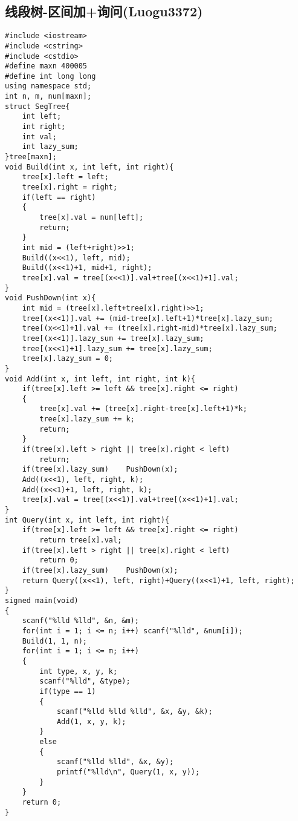 \documentclass[UTF8]{ctexart}
\begin{document}
	\subsection{线段树-区间加+询问(Luogu3372)}
	{\setmainfont{Consolas}
\begin{lstlisting}
#include <iostream>
#include <cstring>
#include <cstdio>
#define maxn 400005
#define int long long
using namespace std;
int n, m, num[maxn];
struct SegTree{
	int left;
	int right;
	int val;
	int lazy_sum;
}tree[maxn];
void Build(int x, int left, int right){
	tree[x].left = left;
	tree[x].right = right;
	if(left == right)
	{
		tree[x].val = num[left];
		return;
	}
	int mid = (left+right)>>1;
	Build((x<<1), left, mid);
	Build((x<<1)+1, mid+1, right);
	tree[x].val = tree[(x<<1)].val+tree[(x<<1)+1].val;
}
void PushDown(int x){
	int mid = (tree[x].left+tree[x].right)>>1;
	tree[(x<<1)].val += (mid-tree[x].left+1)*tree[x].lazy_sum;
	tree[(x<<1)+1].val += (tree[x].right-mid)*tree[x].lazy_sum;
	tree[(x<<1)].lazy_sum += tree[x].lazy_sum;
	tree[(x<<1)+1].lazy_sum += tree[x].lazy_sum;
	tree[x].lazy_sum = 0;
}
void Add(int x, int left, int right, int k){
	if(tree[x].left >= left && tree[x].right <= right)
	{
		tree[x].val += (tree[x].right-tree[x].left+1)*k;
		tree[x].lazy_sum += k;
		return;
	}
	if(tree[x].left > right || tree[x].right < left)
		return;
	if(tree[x].lazy_sum)	PushDown(x);
	Add((x<<1), left, right, k);
	Add((x<<1)+1, left, right, k);
	tree[x].val = tree[(x<<1)].val+tree[(x<<1)+1].val;
}
int Query(int x, int left, int right){
	if(tree[x].left >= left && tree[x].right <= right)
		return tree[x].val;
	if(tree[x].left > right || tree[x].right < left)
		return 0;
	if(tree[x].lazy_sum)	PushDown(x);
	return Query((x<<1), left, right)+Query((x<<1)+1, left, right);
}
signed main(void)
{
	scanf("%lld %lld", &n, &m);
	for(int i = 1; i <= n; i++)	scanf("%lld", &num[i]);
	Build(1, 1, n);
	for(int i = 1; i <= m; i++)
	{
		int type, x, y, k;
		scanf("%lld", &type);
		if(type == 1)
		{
			scanf("%lld %lld %lld", &x, &y, &k);
			Add(1, x, y, k);
		}
		else
		{
			scanf("%lld %lld", &x, &y);
			printf("%lld\n", Query(1, x, y));
		}
	}
	return 0;
}
\end{lstlisting}}
\newpage
\end{document}
